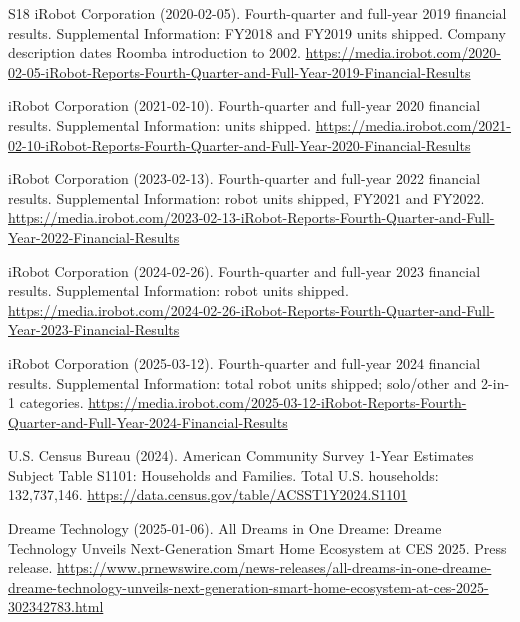 \documentclass[11pt,a4paper]{article}
\begin{document}
\begin{thebibliography}{S18}
 iRobot Corporation (2020-02-05). Fourth-quarter and full-year 2019 financial results. Supplemental Information: FY2018 and FY2019 units shipped. Company description dates Roomba introduction to 2002.
\url{https://media.irobot.com/2020-02-05-iRobot-Reports-Fourth-Quarter-and-Full-Year-2019-Financial-Results}

 iRobot Corporation (2021-02-10). Fourth-quarter and full-year 2020 financial results. Supplemental Information: units shipped.
\url{https://media.irobot.com/2021-02-10-iRobot-Reports-Fourth-Quarter-and-Full-Year-2020-Financial-Results}

 iRobot Corporation (2023-02-13). Fourth-quarter and full-year 2022 financial results. Supplemental Information: robot units shipped, FY2021 and FY2022.
\url{https://media.irobot.com/2023-02-13-iRobot-Reports-Fourth-Quarter-and-Full-Year-2022-Financial-Results}

 iRobot Corporation (2024-02-26). Fourth-quarter and full-year 2023 financial results. Supplemental Information: robot units shipped.
\url{https://media.irobot.com/2024-02-26-iRobot-Reports-Fourth-Quarter-and-Full-Year-2023-Financial-Results}

 iRobot Corporation (2025-03-12). Fourth-quarter and full-year 2024 financial results. Supplemental Information: total robot units shipped; solo/other and 2-in-1 categories.
\url{https://media.irobot.com/2025-03-12-iRobot-Reports-Fourth-Quarter-and-Full-Year-2024-Financial-Results}

 U.S. Census Bureau (2024). American Community Survey 1-Year Estimates Subject Table S1101: Households and Families. Total U.S. households: 132,737,146.
\url{https://data.census.gov/table/ACSST1Y2024.S1101}

 Dreame Technology (2025-01-06). All Dreams in One Dreame: Dreame Technology Unveils Next-Generation Smart Home Ecosystem at CES 2025. Press release.
\url{https://www.prnewswire.com/news-releases/all-dreams-in-one-dreame-dreame-technology-unveils-next-generation-smart-home-ecosystem-at-ces-2025-302342783.html}

\end{thebibliography}
\end{document}
